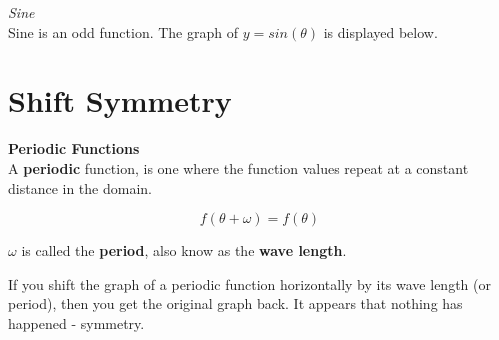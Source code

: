 \documentclass{ximera}
\begin{document}
\begin{example} \textit{Sine} \\

Sine is an odd function.  The graph of $y= sin(\theta)$ is displayed below. 

\begin{image}
\end{image}


\end{example}















\section{Shift Symmetry}


\begin{definition} \textbf{\textcolor{green!50!black}{Periodic Functions}} \\


A \textbf{periodic} function, is one where the function values repeat at a constant distance in the domain.



\[ f(\theta + \omega) = f(\theta) \]



$\omega$ is called the \textbf{period}, also know as the \textbf{wave length}. 



If you shift the graph of a periodic function horizontally by its wave length (or period), then you get the original graph back.  It appears that nothing has happened - symmetry.

\end{definition}
\end{document}
